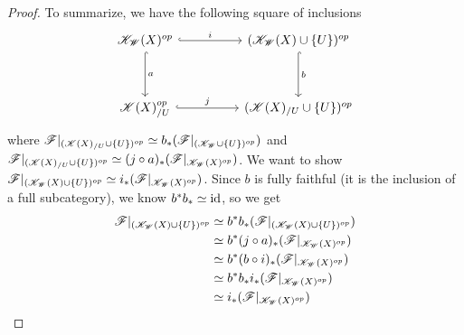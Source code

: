 \documentclass[../../thesis.tex]{subfiles}
\begin{document}
\begin{proof}
    To summarize, we have the following square of inclusions
    \[\begin{tikzcd}
            {\K_{\W}(X)^{op}} && {(\K_{\W}(X)\cup \{U\})^{op}} \\
            \\
            {\K(X)_{/U}^{op}} && {(\K(X)_{/U} \cup \{U\})^{op}}
            \arrow["{b}", hook, from=1-3, to=3-3]
            \arrow["{j}", hook, from=3-1, to=3-3]
            \arrow["{a}", hook, from=1-1, to=3-1]
            \arrow["{i}" ,hook, from=1-1, to=1-3]
        \end{tikzcd}\]
    where $\mathscr{F}|_{(\mathscr{K}(X)_{/U} \cup \{ U \})^{op}} \simeq b_*(\mathscr{F}|_{(\mathscr{K}_{\mathscr{W}} \cup \{U\})^{op}})$ and $\mathscr{F}|_{(\mathscr{K}(X)_{/U} \cup \{U\})^{op}} \simeq (j\circ a)_*(\mathscr{F}|_{\mathscr{K}_{\mathscr{W}}(X)^{op}})$.
    We want to show $\mathscr{F}|_{(\mathscr{K}_{\mathscr{W}}(X) \cup \{U\})^{op}} \simeq i_*(\mathscr{F}|_{\mathscr{K}_{\mathscr{W}}(X)^{op}})$.
    Since $b$ is fully faithful (it is the inclusion of a full subcategory), we know $b^*b_* \simeq \operatorname{id}$, so we get
    \begin{align}
        \mathscr{F}|_{(\mathscr{K}_{\mathscr{W}}(X)\cup \{U\})^{op}} & \simeq b^*b_*(\mathscr{F}|_{(\mathscr{K}_{\mathscr{W}}(X)\cup \{U\})^{op}}) \\
                                        & \simeq b^*(j\circ a)_* (\mathscr{F}|_{\mathscr{K}_{\mathscr{W}}(X)^{op}})   \\
                                        & \simeq b^*(b \circ i)_*(\mathscr{F}|_{\mathscr{K}_{\mathscr{W}}(X)^{op}})   \\
                                        & \simeq b^*b_*i_*(\mathscr{F}|_{\mathscr{K}_{\mathscr{W}}(X)^{op}})          \\
                                        & \simeq i_*(\mathscr{F}|_{\mathscr{K}_{\mathscr{W}}(X)^{op}})
    \end{align}

\end{proof}
\end{document}
